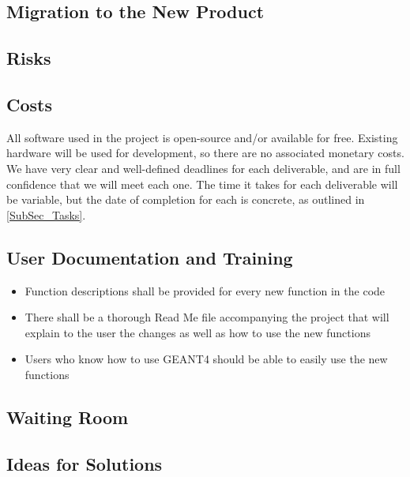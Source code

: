 \documentclass[12pt]{article}
\begin{document}
\subsection{Migration to the New Product} %

\subsection{Risks} %

\subsection{Costs} %
All software used in the project is open-source and/or available for free. Existing hardware will be used for development, so there are no associated monetary costs.\\

We have very clear and well-defined deadlines for each deliverable, and are in full confidence that we will meet each one. The time it takes for each deliverable will be variable, but the date of completion for each is concrete, as outlined in \ref{SubSec_Tasks}.

\subsection{User Documentation and Training} %
\begin{itemize}
	\item Function descriptions shall be provided for every new function in the code
	\item There shall be a thorough Read Me file accompanying the project that will explain to the user the changes as well as how to use the new functions
	\item Users who know how to use GEANT4 should be able to easily use the new functions
\end{itemize}

\subsection{Waiting Room} %

\subsection{Ideas for Solutions} %
\end{document}
